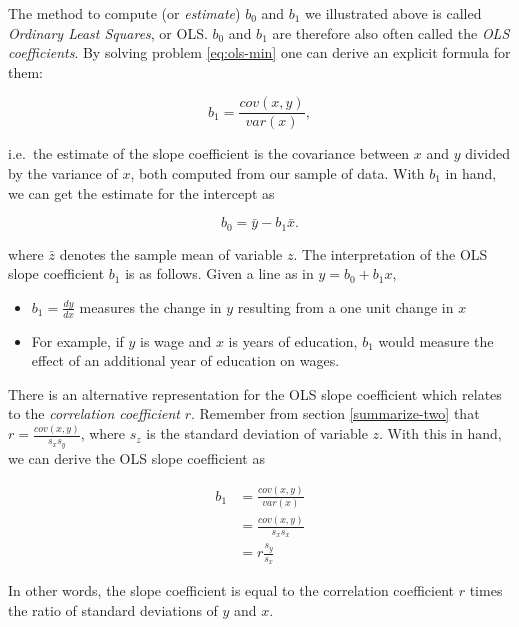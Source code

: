 \documentclass[]{book}
\providecommand{\tightlist}{%
  \setlength{\itemsep}{0pt}\setlength{\parskip}{0pt}}
\begin{document}
The method to compute (or \emph{estimate}) \(b_0\) and \(b_1\) we
illustrated above is called \emph{Ordinary Least Squares}, or OLS.
\(b_0\) and \(b_1\) are therefore also often called the \emph{OLS
coefficients}. By solving problem \eqref{eq:ols-min} one can derive an
explicit formula for them:

\begin{equation}
b_1 = \frac{cov(x,y)}{var(x)},  \label{eq:beta1hat}
\end{equation}

i.e.~the estimate of the slope coefficient is the covariance between
\(x\) and \(y\) divided by the variance of \(x\), both computed from our
sample of data. With \(b_1\) in hand, we can get the estimate for the
intercept as

\begin{equation}
b_0 = \bar{y} - b_1 \bar{x}.  \label{eq:beta0hat}
\end{equation}

where \(\bar{z}\) denotes the sample mean of variable \(z\). The
interpretation of the OLS slope coefficient \(b_1\) is as follows. Given
a line as in \(y = b_0 + b_1 x\),

\begin{itemize}
\tightlist
\item
  \(b_1 = \frac{d y}{d x}\) measures the change in \(y\) resulting from
  a one unit change in \(x\)
\item
  For example, if \(y\) is wage and \(x\) is years of education, \(b_1\)
  would measure the effect of an additional year of education on wages.
\end{itemize}

There is an alternative representation for the OLS slope coefficient
which relates to the \emph{correlation coefficient} \(r\). Remember from
section \ref{summarize-two} that \(r = \frac{cov(x,y)}{s_x s_y}\), where
\(s_z\) is the standard deviation of variable \(z\). With this in hand,
we can derive the OLS slope coefficient as

\begin{align}
b_1 &= \frac{cov(x,y)}{var(x)}\\
    &= \frac{cov(x,y)}{s_x s_x} \\
    &= r\frac{s_y}{s_x} \label{eq:beta1-r}
\end{align}

In other words, the slope coefficient is equal to the correlation
coefficient \(r\) times the ratio of standard deviations of \(y\) and
\(x\).
\end{document}
